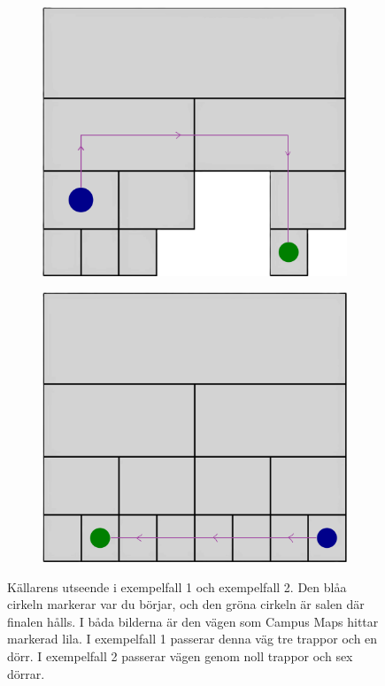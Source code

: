 \begin{centering}
  \begin{figure}[h]
      \centering
      \begin{subfigure}
        \centering
        \includegraphics[scale=0.8]{sample1.png}
      \end{subfigure}
      \begin{subfigure}
        \centering
        \includegraphics[scale=0.8]{sample2.png}
      \end{subfigure}
      \centering
      \caption{Källarens utseende i exempelfall 1 och exempelfall 2. 
      Den blåa cirkeln markerar var du börjar, och den gröna cirkeln är salen där finalen hålls.
      I båda bilderna är den vägen som Campus Maps hittar markerad lila.
      I exempelfall 1 passerar denna väg tre trappor och en dörr.
      I exempelfall 2 passerar vägen genom noll trappor och sex dörrar.
      }
      \label{fig:samples}
  \end{figure}
\end{centering}

